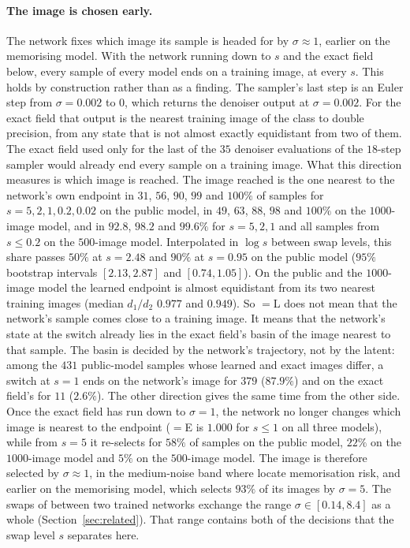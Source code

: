 \documentclass{article} %
\theoremstyle{plain}
\theoremstyle{definition}
\theoremstyle{remark}
\begin{document}
\paragraph{The image is chosen early.} The network fixes which image its sample is headed for by
$\sigma\approx1$, earlier on the memorising model. With the network running down to $s$ and the exact field
below, every sample of every model ends on a training image, at every $s$. This holds by
construction rather than as a finding. The sampler's last step is an Euler step from
$\sigma=0.002$ to $0$, which returns the denoiser output at $\sigma=0.002$. For the exact field that
output is the nearest training image of the class to double precision, from any state that
is not almost exactly equidistant from two of them. The exact field used only for the last of the
$35$ denoiser evaluations of the $18$-step sampler would already end every sample on a training
image. What this direction measures is which image is reached. The image reached is the one nearest
to the network's own endpoint in $31$, $56$, $90$, $99$ and $100\%$ of samples for $s=5,2,1,0.2,0.02$ on the
public model, in $49$, $63$, $88$, $98$ and $100\%$ on the $1000$-image model, and in $92.8$, $98.2$ and
$99.6\%$ for $s=5,2,1$ and all samples from $s\le0.2$ on the $500$-image model. Interpolated in
$\log s$ between swap levels, this share passes $50\%$ at $s=2.48$ and $90\%$ at $s=0.95$ on the
public model ($95\%$ bootstrap intervals $[2.13,2.87]$ and $[0.74,1.05]$). On the public and the $1000$-image model the learned endpoint is almost equidistant from its two
nearest training images (median $d_1/d_2$ $0.977$ and $0.949$). So $=$L does not mean that the
network's sample comes close to a training image. It means that the network's state at the switch
already lies in the exact field's basin of the image nearest to that sample. The basin is decided by
the network's trajectory, not by the latent: among the $431$ public-model samples whose learned and
exact images differ, a switch at $s=1$ ends on the network's image for $379$ ($87.9\%$) and on the
exact field's for $11$ ($2.6\%$). The other direction gives the same time from the other side. Once
the exact field has run down to $\sigma=1$, the network no longer changes which image is nearest to
the endpoint ($=$E is $1.000$ for $s\le1$ on all three models), while from $s=5$ it re-selects for
$58\%$ of samples on the public model, $22\%$ on the $1000$-image model and $5\%$ on the $500$-image
model. The image is therefore selected by $\sigma\approx1$, in the medium-noise band where
\citet{dodson2026calm} locate memorisation risk, and earlier on the memorising model, which selects
$93\%$ of its images by $\sigma=5$. The swaps of \citet{dodson2026calm} between two trained networks
exchange the range $\sigma\in[0.14,8.4]$ as a whole (Section~\ref{sec:related}). That range contains
both of the decisions that the swap level $s$ separates here.
\end{document}
